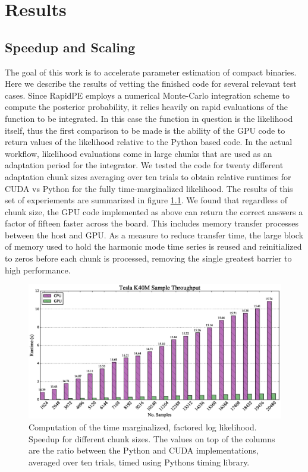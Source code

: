 \chapter{Results}

\section{Speedup and Scaling}
The goal of this work is to accelerate parameter estimation of compact binaries. Here we describe the results of vetting the finished code for several relevant test cases. Since RapidPE employs a numerical Monte-Carlo integration scheme to compute the posterior probability, it relies heavily on rapid evaluations of the function to be integrated. In this case the function in question is the likelihood itself, thus the first comparison to be made is the ability of the GPU code to return values of the likelihood relative to the Python based code. In the actual workflow, likelihood evaluations come in large chunks that are used as an adaptation period for the integrator. We tested the code for twenty different adaptation chunk sizes averaging over ten trials to obtain relative runtimes for CUDA vs Python for the fully time-marginalized likelihood. The results of this set of experiements are summarized in figure \ref{fig:speedup}. We found that regardless of chunk size, the GPU code implemented as above can return the correct answers a factor of fifteen faster across the board. This includes memory transfer processes between the host and GPU. As a measure to reduce transfer time, the large block of memory used to hold the harmonic mode time series is reused and reinitialized to zeros before each chunk is processed, removing the single greatest barrier to high performance.    
\begin{figure}[!htb]\label{fig:speedup}
\hspace{-5.0cm}
\includegraphics[scale=0.57]{speedup.eps}
\caption{Computation of the time marginalized, factored log likelihood. Speedup for different chunk sizes. The values on top of the columns are the ratio between the Python and CUDA implementations, averaged over ten trials, timed using Pythons timing library.}
\end{figure}

